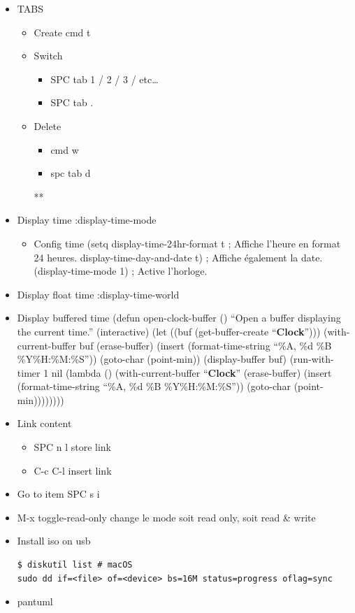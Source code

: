 \documentclass{article}
\begin{document}
\begin{itemize}
\begin{itemize}
\item tab M-
\end{itemize}
\item TABS
\label{sec:orgb8191c9}
\begin{itemize}
\item Create
\label{sec:org0d7117f}
cmd t
\item Switch
\label{sec:org684f7a5}
\begin{itemize}
\item SPC tab 1 / 2 / 3 / etc\ldots{}
\item SPC tab .
\end{itemize}
\item Delete
\label{sec:org3c3ec6f}
\begin{itemize}
\item cmd w
\item spc tab d
\end{itemize}
**
\end{itemize}
\item Display time
\label{sec:orgb8b95e9}
:display-time-mode
\begin{itemize}
\item Config time
\label{sec:org33b735b}
(setq display-time-24hr-format t   ; Affiche l'heure en format 24 heures.
      display-time-day-and-date t) ; Affiche également la date.
(display-time-mode 1)              ; Active l'horloge.
\end{itemize}
\item Display float time
\label{sec:orgaf25a75}
:display-time-world
\item Display buffered time
\label{sec:orgdd394c5}
(defun open-clock-buffer ()
  ``Open a buffer displaying the current time.''
  (interactive)
  (let ((buf (get-buffer-create ``\textbf{Clock}'')))
    (with-current-buffer buf
      (erase-buffer)
      (insert (format-time-string ``\%A, \%d \%B \%Y\n\%H:\%M:\%S''))
      (goto-char (point-min))
      (display-buffer buf)
      (run-with-timer 1 nil (lambda ()
                              (with-current-buffer ``\textbf{Clock}''
                                (erase-buffer)
                                (insert (format-time-string ``\%A, \%d \%B \%Y\n\%H:\%M:\%S''))
                                (goto-char (point-min))))))))
\item Link content
\label{sec:org71a7ae2}
\begin{itemize}
\item SPC n l store link
\item C-c C-l insert link
\end{itemize}
\item Go to item
\label{sec:orgebbc157}
SPC s i
\item M-x toggle-read-only
\label{sec:org12686cc}
change le mode soit read only, soit read \& write
\item Install iso on usb
\label{sec:org57543a3}
\begin{verbatim}
$ diskutil list # macOS
sudo dd if=<file> of=<device> bs=16M status=progress oflag=sync
\end{verbatim}
\item pantuml
\label{sec:org45eb349}
\end{itemize}
\end{document}

